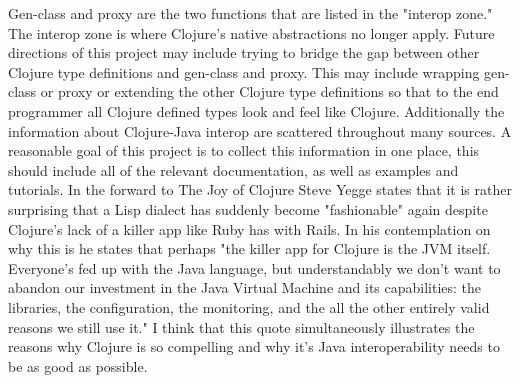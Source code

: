 \documentclass[12pt]{article}
\begin{document}
	Gen-class and proxy are the two functions that are listed in the "interop zone." The interop zone is where Clojure's native abstractions no longer apply\cite{choosing-types}. Future directions of this project may include trying to bridge the gap between other Clojure type definitions and gen-class and proxy. This may include wrapping gen-class or proxy or extending the other Clojure type definitions so that to the end programmer all Clojure defined types look and feel like Clojure. 
	Additionally the information about Clojure-Java interop are scattered throughout many sources. A reasonable goal of this project is to collect this information in one place, this should include all of the relevant documentation, as well as examples and tutorials.
	In the forward to The Joy of Clojure\cite{joy} Steve Yegge states that it is rather surprising that a Lisp dialect has suddenly become "fashionable" again despite Clojure's lack of a killer app like Ruby has with Rails. In his contemplation on why this is he states that perhaps "the killer app for Clojure is the JVM itself. Everyone's fed up with the Java language, but understandably we don't want to abandon our investment in the Java Virtual Machine and its capabilities: the libraries, the configuration, the monitoring, and the all the other entirely valid reasons we still use it." I think that this quote simultaneously illustrates the reasons why Clojure is so compelling and why it's Java interoperability needs to be as good as possible.




%
%

%  
%
%




\end{document}
